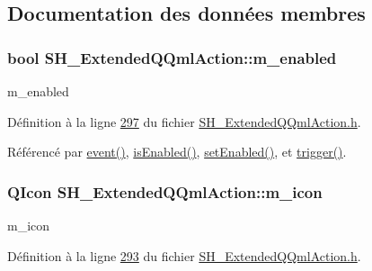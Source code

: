 \subsection{Documentation des données membres}
\hypertarget{classSH__ExtendedQQmlAction_ad93920806001da9e32b7b2a3d3d9213e}{
\subsubsection[{m\-\_\-enabled}]{\setlength{\rightskip}{0pt plus 5cm}bool S\-H\-\_\-\-Extended\-Q\-Qml\-Action\-::m\-\_\-enabled\hspace{0.3cm}{\ttfamily [private]}}}\label{classSH__ExtendedQQmlAction_ad93920806001da9e32b7b2a3d3d9213e}


m\-\_\-enabled 



Définition à la ligne \hyperlink{SH__ExtendedQQmlAction_8h_source_l00297}{297} du fichier \hyperlink{SH__ExtendedQQmlAction_8h_source}{S\-H\-\_\-\-Extended\-Q\-Qml\-Action.\-h}.



Référencé par \hyperlink{classSH__ExtendedQQmlAction_a2067689e7c1e14a316ad6095e57d6cf6}{event()}, \hyperlink{classSH__ExtendedQQmlAction_a7de35315be948b46e187a38b13629b6e}{is\-Enabled()}, \hyperlink{classSH__ExtendedQQmlAction_a29f12b5f71a384d860062ea7b8981aeb}{set\-Enabled()}, et \hyperlink{classSH__ExtendedQQmlAction_adb355d9ce9bc1539651377427a264f34}{trigger()}.

\hypertarget{classSH__ExtendedQQmlAction_a4386f56e28c2c70cfedd16c1d8c2c4a4}{
\subsubsection[{m\-\_\-icon}]{\setlength{\rightskip}{0pt plus 5cm}Q\-Icon S\-H\-\_\-\-Extended\-Q\-Qml\-Action\-::m\-\_\-icon\hspace{0.3cm}{\ttfamily [private]}}}\label{classSH__ExtendedQQmlAction_a4386f56e28c2c70cfedd16c1d8c2c4a4}


m\-\_\-icon 



Définition à la ligne \hyperlink{SH__ExtendedQQmlAction_8h_source_l00293}{293} du fichier \hyperlink{SH__ExtendedQQmlAction_8h_source}{S\-H\-\_\-\-Extended\-Q\-Qml\-Action.\-h}.



